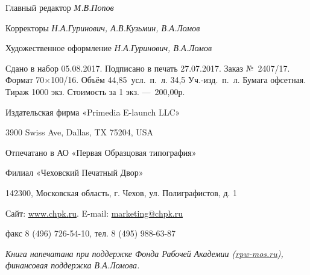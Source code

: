 \documentclass[twoside]{article}
\begin{document}
\bigskip

Главный редактор \textit{М.\hspace{0.25em}В.\hspace{0.25em}Попов}

Корректоры \textit{Н.\hspace{0.25em}А.\hspace{0.25em}Гуринович,
А.\hspace{0.25em}В.\hspace{0.25em}Кузьмин,
В.\hspace{0.25em}А.\hspace{0.25em}Ломов}

Художественное оформление
\textit{Н.\hspace{0.25em}А.\hspace{0.25em}Гуринович,
В.\hspace{0.25em}А.\hspace{0.25em}Ломов}


\bigskip

Сдано в набор 05.08.2017. Подписано в печать 27.07.2017. \newline
Заказ №~2407/17. Формат 70${\times}$100/16. Объём 44,85~усл.~п.~л. 34,5
Уч.-изд.~п.~л.\newline
Бумага офсетная. Тираж 1000 экз. Стоимость за 1 экз.
—~200,00\hspace{0.25em}р.


\bigskip

Издательская фирма «Primedia E-launch LLC»

3900 Swiss Ave, Dallas, TX 75204, USA


\bigskip

Отпечатано в АО «Первая Образцовая типография»

Филиал «Чеховский Печатный Двор»

142300, Московская область, г. Чехов, ул. Полиграфистов, д. 1

Сайт:
\href{http://www.chpk.ru}{\textcolor[rgb]{0.0,0.0,0.039215688}{www}}\href{http://www.chpk.ru}{\textcolor[rgb]{0.0,0.0,0.039215688}{.}}\href{http://www.chpk.ru}{\textcolor[rgb]{0.0,0.0,0.039215688}{chpk}}\href{http://www.chpk.ru}{\textcolor[rgb]{0.0,0.0,0.039215688}{.}}\href{http://www.chpk.ru}{\textcolor[rgb]{0.0,0.0,0.039215688}{ru}}.
E-mail:
\href{mailto:marketing@chpk.ru}{\textcolor[rgb]{0.0,0.0,0.039215688}{marketing@chpk.ru}}

факс 8 (496) 726-54-10, тел. 8 (495) 988-63-87


\bigskip

{\itshape
\textup{Книга напечатана при поддержке Фонда Рабочей Академии
(}\href{http://rpw-mos.ru/}{\textup{rpw-mos.ru}}\textup{), финансовая
поддержка В.\hspace{0.25em}А.\hspace{0.25em}Ломова.}}
\end{document}
